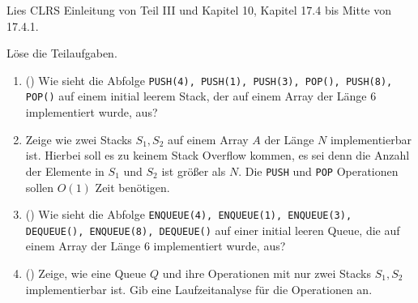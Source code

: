 \documentclass{uebung_cs}
\begin{document}
\begin{aufgabe}\label{lesen}
	Lies CLRS Einleitung von Teil III und Kapitel 10, Kapitel 17.4 bis Mitte von 17.4.1.
\end{aufgabe}

\begin{aufgabe}
	Löse die Teilaufgaben.
	\begin{enumerate}
		\item (\warmup) Wie sieht die Abfolge \texttt{PUSH(4), PUSH(1), PUSH(3), POP(), PUSH(8), POP()} auf einem initial leerem Stack, der auf einem Array der Länge 6 implementiert wurde, aus?
		\item Zeige wie zwei Stacks $S_1, S_2$ auf einem Array $A$ der Länge $N$ implementierbar ist.
		Hierbei soll es zu keinem Stack Overflow kommen, es sei denn die Anzahl der Elemente in $S_1$ und $S_2$ ist größer als $N$.
		Die \texttt{PUSH} und \texttt{POP} Operationen sollen $O(1)$ Zeit benötigen.
		\item (\warmup) Wie sieht die Abfolge \texttt{ENQUEUE(4), ENQUEUE(1), ENQUEUE(3), DEQUEUE(), ENQUEUE(8), DEQUEUE()} auf einer initial leeren Queue, die auf einem Array der Länge 6 implementiert wurde, aus?
		\item (\hard) Zeige, wie eine Queue $Q$ und ihre Operationen mit nur zwei Stacks $S_1, S_2$ implementierbar ist.
		Gib eine Laufzeitanalyse für die Operationen an.
	\end{enumerate}
\end{aufgabe}

\end{document}

